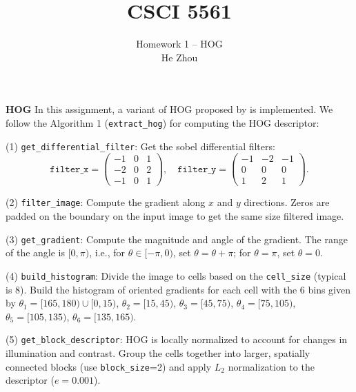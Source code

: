 \documentclass[11pt]{scrartcl}
\begin{document}
\title{CSCI 5561}
\author{\Large Homework 1 -- HOG\\
	He Zhou}  %
\maketitle

\newpage
\noindent\textbf{HOG }\quad
In this assignment, a variant of HOG proposed by \cite{dalal2005histograms} is implemented. We follow the Algorithm 1 (\texttt{extract\_hog}) for computing the HOG descriptor:

(1) \texttt{get\_differential\_filter}: Get the sobel differential filters:
\begin{equation*}
	\texttt{filter\_x}=\begin{pmatrix}
	-1&0&1\\-2&0&2\\-1&0&1
	\end{pmatrix},\quad
	\texttt{filter\_y}=\begin{pmatrix}
		-1&-2&-1\\0&0&0\\1&2&1
	\end{pmatrix}.
\end{equation*}

(2) \texttt{filter\_image}: Compute the gradient along $x$ and $y$ directions. Zeros are padded on the boundary on the input image to get the same size filtered image.

(3) \texttt{get\_gradient}: Compute the magnitude and angle of the gradient. The range of the angle is $[0,\pi)$, i.e., for $\theta\in[-\pi,0)$, set $\theta=\theta+\pi$; for $\theta=\pi$, set 
$\theta=0$.

(4) \texttt{build\_histogram}: Divide the image to cells based on the \texttt{cell\_size} (typical is 8). Build the histogram of oriented gradients for each cell with the $6$ bins given by $\theta_1=[165, 180)\cup[0, 15)$, $\theta_2=[15,45)$, $\theta_3=[45,75)$, $\theta_4=[75,105)$, $\theta_5=[105,135)$, $\theta_6=[135,165)$.

(5) \texttt{get\_block\_descriptor}: HOG is locally normalized to account for changes in illumination and contrast. Group the cells together into larger, spatially connected blocks (use \texttt{block\_size}=2) and apply $L_2$ normalization to the descriptor ($e=0.001$).
\end{document}
